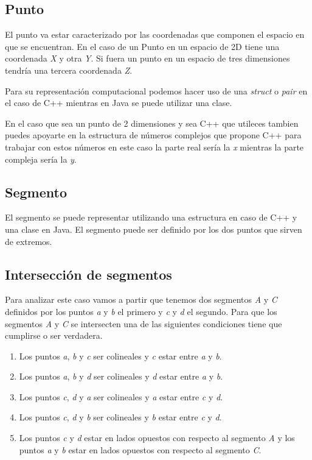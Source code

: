 \subsection{Punto}
El punto va estar caracterizado por las coordenadas que componen el espacio en que se encuentran. En el caso de un Punto en un espacio de 2D tiene una coordenada \emph{X} y otra \emph{Y}. Si fuera un punto en un espacio de tres dimensiones tendría una tercera coordenada \emph{Z}.

Para su representación computacional podemos hacer uso de una \emph{struct} o \emph{pair} en el caso de C++ mientras en Java se puede utilizar una clase.

En el caso que sea un punto de 2 dimensiones y sea C++ que utileces tambien puedes apoyarte en la estructura de números complejos que propone C++ para trabajar con estos números en este caso la parte real sería la \emph{x} mientras la parte compleja sería la \emph{y}.

\subsection{Segmento}

El segmento se puede representar utilizando una estructura en caso de C++ y una clase en Java. El segmento puede ser definido por los dos puntos que sirven de extremos.

\subsection{Intersección de segmentos}
Para analizar este caso vamos a partir que tenemos dos segmentos {\em A} y {\em C} definidos por los puntos {\em a} y {\em b} el primero y {\em c} y {\em d} el segundo. Para que los segmentos {\em A} y {\em C} se intersecten una de las siguientes condiciones tiene que cumplirse o ser verdadera.

\begin{enumerate}
	\item Los puntos {\em a}, {\em b} y {\em c} ser colineales y {\em c} estar entre {\em a} y  {\em b}.
	\item Los puntos {\em a}, {\em b} y {\em d} ser colineales y {\em d} estar entre {\em a} y {\em b}.
	\item Los puntos {\em c}, {\em d} y {\em a} ser colineales y {\em a} estar entre {\em c} y {\em d}.
	\item Los puntos {\em c}, {\em d} y {\em b} ser colineales y {\em b} estar entre {\em c} y {\em d}.
	\item Los puntos {\em c} y {\em d} estar en lados opuestos con respecto al segmento {\em A} y los puntos {\em a} y {\em b} estar en lados opuestos con respecto al segmento {\em C}.
\end{enumerate}

